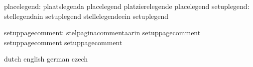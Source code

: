                   placelegend:  plaatslegenda                placelegend 
                                platzierelegende             placelegend %
                  setuplegend:  stellegendain                setuplegend
                                stellelegendeein             setuplegend %
 
             setuppagecomment:  stelpaginacommentaarin       setuppagecomment  
                                setuppagecomment             setuppagecomment %

\stopcommands




\startcommands                  dutch                        english
                                german                       czech


